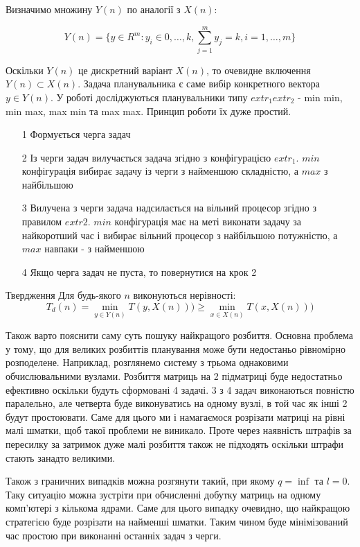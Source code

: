 Визначимо множину $Y(n)$ по аналогії з $X(n)$:

\begin{equation}
	\label{eq:Y(n)}
	Y(n) = \big\{y \in R^m : y_i \in {0, \ldots, k}, \sum_{j = 1}^{m} y_j = k, i = 1,\ldots,m \big\}
\end{equation}

Оскільки $Y(n)$ це дискретний варіант $X(n)$, то очевидне включення $Y(n) \subset X(n)$.
Задача планувальника є саме вибір конкретного вектора $y \in Y(n)$.
У роботі досліджуються планувальники типу $extr_1 extr_2$ - min min, min max, max min та max max. Принцип роботи їх дуже простий.

\begin{itemize}
	\item[1] Формується черга задач
	\item[2] Із черги задач вилучається задача згідно з конфігурацією $extr_1$. $min$ конфігурація вибирає задачу із черги з найменшою складністю, а $max$ з найбільшою
	\item[3] Вилучена з черги задача надсилається на вільний процесор згідно з правилом $extr2$. $min$ конфігурація має на меті виконати задачу за найкоротший час і вибирає вільний процесор з найбільшою потужністю, а $max$ навпаки - з найменшою
	\item[4] Якщо черга задач не пуста, то повернутися на крок 2
\end{itemize}

Твердження
Для будь-якого $n$ виконуються нерівності:
\begin{equation}
	T_d(n) = \min\limits_{y \in Y(n)} T(y, X(n))) \ge \min\limits_{x \in X(n)} T(x, X(n)))
\end{equation}

Також варто пояснити саму суть пошуку найкращого розбиття. Основна проблема у тому, що для великих розбиттів планування може бути недостаньо рівномірно розподелене. Наприклад, розглянемо систему з трьома однаковими обчислювальними вузлами. Розбиття матриць на 2 підматриці буде недостатньо ефективно оскільки будуть сформовані 4 задачі. 3 з 4 задач виконаються повністю паралельно, але четверта буде виконуватись на одному вузлі, в той час як інші 2 будут простоювати. Саме для цього ми і намагаємося розрізати матриці на рівні малі шматки, щоб такої проблеми не виникало. Проте через наявність штрафів за пересилку за затримок дуже малі розбиття також не підходять оскільки штрафи стають занадто великими.

Також з граничних випадків можна розгянути такий, при якому $q=\inf$ та $l=0$. Таку ситуацію можна зустріти при обчисленні добутку матриць на одному комп'ютері з кількома ядрами. Саме для цього випадку очевидно, що найкращою стратегією буде розрізати на найменші шматки. Таким чином буде мінімізований час простою при виконанні останніх задач з черги.

